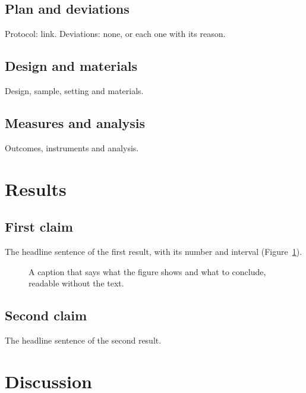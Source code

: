 \documentclass[11pt]{article}
\begin{document}
\subsection{Plan and deviations}
Protocol: link. Deviations: none, or each one with its reason.

\subsection{Design and materials}
Design, sample, setting and materials.

\subsection{Measures and analysis}
Outcomes, instruments and analysis.

\section{Results}\label{sec:results}

\subsection{First claim}
The headline sentence of the first result, with its number and interval
(Figure~\ref{fig:first}).

\begin{figure}[ht]
  \centering
  \caption{A caption that says what the figure shows and what to conclude,
    readable without the text.}
  \label{fig:first}
\end{figure}

\subsection{Second claim}
The headline sentence of the second result.

\section{Discussion}\label{sec:discussion}
\end{document}
